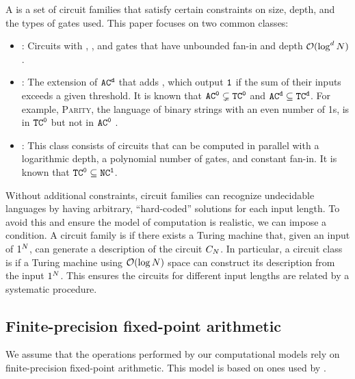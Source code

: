 A  is a set of circuit families that satisfy certain constraints on size, depth, and the types of gates used.
This paper focuses on two common classes:
\begin{itemize}[noitemsep,topsep=0pt]
   \item {}: Circuits with \notGate, \andGate, and \orGate gates that have unbounded fan-in and depth ${{{{\mathcal{O}}}(\log^d{{N}})}}$.
   \item {}: The extension of ${{{{{{\mathtt{AC}}}^{\mathtt{d}}}}}}$ that adds , which output ${\texttt{1}}$ if the sum of their inputs exceeds a given threshold. 
   It is known that ${{{{{{\mathtt{AC}}}^{\mathtt{0}}}}}} \subsetneq {{{{{{\mathtt{TC}}}^{\mathtt{0}}}}}}$ and ${{{{{{\mathtt{AC}}}^{\mathtt{d}}}}}} \subseteq {{{{{{\mathtt{TC}}}^{\mathtt{d}}}}}}$.
   For example, \textsc{Parity}, the language of binary strings with an even number of 1s, is in ${{{{{{\mathtt{TC}}}^{\mathtt{0}}}}}}$ but not in ${{{{{{\mathtt{AC}}}^{\mathtt{0}}}}}}$ \citep{Furst1984}.
   \item {}: This class consists of circuits that can be computed in parallel with a logarithmic depth, a polynomial number of gates, and constant fan-in. 
   It is known that ${{{{{{\mathtt{TC}}}^{\mathtt{0}}}}}} \subseteq {{{{{{\mathtt{NC}}}^{\mathtt{1}}}}}}$.
\end{itemize}

Without additional constraints, circuit families can recognize undecidable languages by having arbitrary, ``hard-coded'' solutions for each input length. 
To avoid this and ensure the model of computation is realistic, we can impose a  condition. 
A circuit family is  if there exists a Turing machine that, given an input of $1^{{N}}$, can generate a description of the circuit ${C}_{{N}}$.
In particular, a circuit class is  if a Turing machine using ${{{{\mathcal{O}}}(\log {{N}})}}$ space can construct its description from the input $1^{{N}}$.
This ensures the circuits for different input lengths are related by a systematic procedure.


\subsection{Finite-precision fixed-point arithmetic} \label{app:fixed-point-arithmetic}

We assume that the operations performed by our computational models rely on finite-precision fixed-point arithmetic.
This model is based on ones used by \citet{li2024chain,saunshi2025reasoninglatentthoughtspower,london2025pausetokensstrictlyincrease}. 


